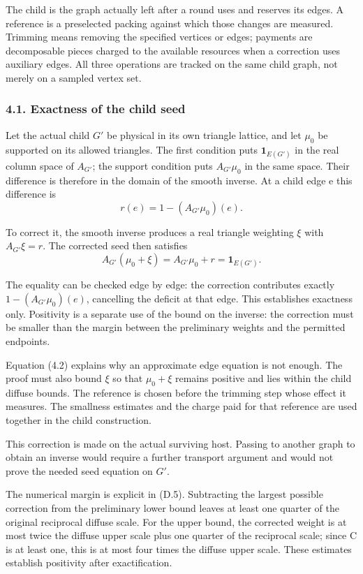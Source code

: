 \documentclass[english,11pt,a4paper]{article}
\begin{document}
The child is the graph actually left after a round uses and reserves its edges. A reference is a preselected packing against which those changes are measured. Trimming means removing the specified vertices or edges; payments are decomposable pieces charged to the available resources when a correction uses auxiliary edges. All three operations are tracked on the same child graph, not merely on a sampled vertex set.

\subsubsection{4.1. Exactness of the child seed}\label{exactness-of-the-child-seed}

Let the actual child \(G'\) be physical in its own triangle lattice, and let \(\mu_0\) be supported on its allowed triangles. The first condition puts \(\mathbf1_{E(G')}\) in the real column space of \(A_{G'}\); the support condition puts \(A_{G'}\mu_0\) in the same space. Their difference is therefore in the domain of the smooth inverse. At a child edge e this difference is
\[r(e)=1-(A_{G'}\mu_0)(e).                                           \tag{4.1}\]

To correct it, the smooth inverse produces a real triangle weighting \(\xi\) with \(A_{G'}\xi=r\). The corrected seed then satisfies
\[A_{G'}(\mu_0+\xi)=A_{G'}\mu_0+r=\mathbf1_{E(G')}.                  \tag{4.2}\]

The equality can be checked edge by edge: the correction contributes exactly \(1-(A_{G'}\mu_0)(e)\), cancelling the deficit at that edge. This establishes exactness only. Positivity is a separate use of the bound on the inverse: the correction must be smaller than the margin between the preliminary weights and the permitted endpoints.

Equation (4.2) explains why an approximate edge equation is not enough. The proof must also bound \(\xi\) so that \(\mu_0+\xi\) remains positive and lies within the child diffuse bounds. The reference is chosen before the trimming step whose effect it measures. The smallness estimates and the charge paid for that reference are used together in the child construction.

This correction is made on the actual surviving host. Passing to another graph to obtain an inverse would require a further transport argument and would not prove the needed seed equation on \(G'\).

The numerical margin is explicit in (D.5). Subtracting the largest possible correction from the preliminary lower bound leaves at least one quarter of the original reciprocal diffuse scale. For the upper bound, the corrected weight is at most twice the diffuse upper scale plus one quarter of the reciprocal scale; since C is at least one, this is at most four times the diffuse upper scale. These estimates establish positivity after exactification.
\end{document}
